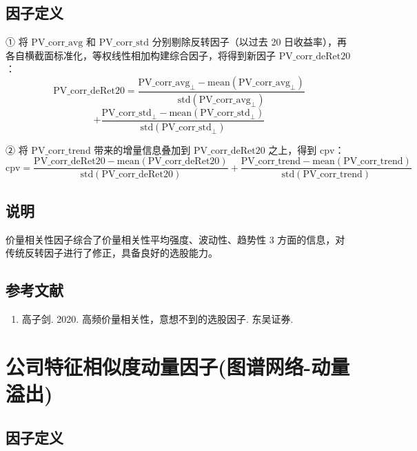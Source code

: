 \documentclass{article}
\begin{document}
\subsection{因子定义}

① 将 \( \mathrm{PV\_corr\_avg} \) 和 \( \mathrm{PV\_corr\_std} \) 分别剔除反转因子（以过去 20 日收益率），再各自横截面标准化，等权线性相加构建综合因子，将得到新因子 \( \mathrm{PV\_corr\_deRet20} \)：
\begin{equation}
    \mathrm{PV\_corr\_deRet20} = \frac{\mathrm{PV\_corr\_avg}_{\perp} - \mathrm{mean}(\mathrm{PV\_corr\_avg}_{\perp})}{\mathrm{std}(\mathrm{PV\_corr\_avg}_{\perp})} 
\end{equation}
\begin{equation}
    +\frac{\mathrm{PV\_corr\_std}_{\perp} - \mathrm{mean}(\mathrm{PV\_corr\_std}_{\perp})}{\mathrm{std}(\mathrm{PV\_corr\_std}_{\perp})}
\end{equation}

② 将 \( \mathrm{PV\_corr\_trend} \) 带来的增量信息叠加到 \( \mathrm{PV\_corr\_deRet20} \) 之上，得到 \( \mathrm{cpv} \)：
\begin{equation}
    \mathrm{cpv} = \frac{\mathrm{PV\_corr\_deRet20} - \mathrm{mean}(\mathrm{PV\_corr\_deRet20})}{\mathrm{std}(\mathrm{PV\_corr\_deRet20})} + \frac{\mathrm{PV\_corr\_trend} - \mathrm{mean}(\mathrm{PV\_corr\_trend})}{\mathrm{std}(\mathrm{PV\_corr\_trend})}
\end{equation}

\subsection{说明}
价量相关性因子综合了价量相关性平均强度、波动性、趋势性 3 方面的信息，对传统反转因子进行了修正，具备良好的选股能力。

\subsection{参考文献}
\begin{enumerate}
    \item 高子剑. 2020. 高频价量相关性，意想不到的选股因子. 东吴证券.
\end{enumerate}

\section{公司特征相似度动量因子(图谱网络-动量溢出)}

\subsection{因子定义}
\end{document}

